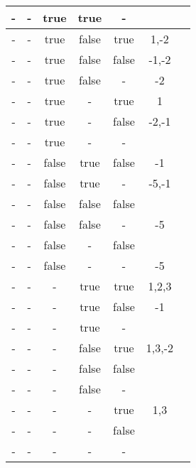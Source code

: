 \begin{longtable}{|c|c|c|c|c|c|c|}
- & - & true & true & - &                 &    \\ \hline 
- & - & true & false & true & 1,-2            &    \\ \hline 
- & - & true & false & false & -1,-2           &    \\ \hline 
- & - & true & false & - & -2              &    \\ \hline 
- & - & true & - & true & 1               &    \\ \hline 
- & - & true & - & false & -2,-1           &    \\ \hline 
- & - & true & - & - &                 &    \\ \hline 
- & - & false & true & false & -1              &    \\ \hline 
- & - & false & true & - & -5,-1           &    \\ \hline 
- & - & false & false & false &                 &    \\ \hline 
- & - & false & false & - & -5              &    \\ \hline 
- & - & false & - & false &                 &    \\ \hline 
- & - & false & - & - & -5              &    \\ \hline 
- & - & - & true & true & 1,2,3           &    \\ \hline 
- & - & - & true & false & -1              &    \\ \hline 
- & - & - & true & - &                 &    \\ \hline 
- & - & - & false & true & 1,3,-2          &    \\ \hline 
- & - & - & false & false &                 &    \\ \hline 
- & - & - & false & - &                 &    \\ \hline 
- & - & - & - & true & 1,3             &    \\ \hline 
- & - & - & - & false &                 &    \\ \hline 
- & - & - & - & - &                 &    \\ \hline 
\end{longtable}
